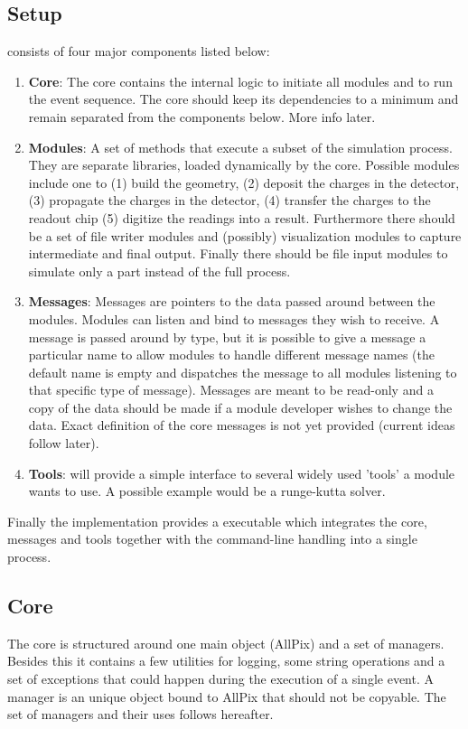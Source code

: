 \subsection{Setup}
\apsq consists of four major components listed below:
\begin{enumerate}
\item \textbf{Core}: The core contains the internal logic to initiate all modules and to run the event sequence. The core should keep its dependencies to a minimum and remain separated from the components below. More info later.
\item \textbf{Modules}: A set of methods that execute a subset of the simulation process. They are separate libraries, loaded dynamically by the core. Possible modules include one to (1) build the geometry, (2) deposit the charges in the detector, (3) propagate the charges in the detector, (4) transfer the charges to the readout chip (5) digitize the readings into a result. Furthermore there should be a set of file writer modules and (possibly) visualization modules to capture intermediate and final output. Finally there should be file input modules to simulate only a part instead of the full process.
\item \textbf{Messages}: Messages are pointers to the data passed around between the modules. Modules can listen and bind to messages they wish to receive. A message is passed around by type, but it is possible to give a message a particular name to allow modules to handle different message names (the default name is empty and dispatches the message to all modules listening to that specific type of message). Messages are meant to be read-only and a copy of the data should be made if a module developer wishes to change the data. Exact definition of the core messages is not yet provided (current ideas follow later).
\item \textbf{Tools}: \apsq will provide a simple interface to several widely used 'tools' a module wants to use. A possible example would be a runge-kutta solver.
\end{enumerate}

Finally the implementation provides a executable which integrates the core, messages and tools together with the command-line handling into a single process.

\subsection{Core}
The core is structured around one main object (AllPix) and a set of managers. Besides this it contains a few utilities for logging, some string operations and a set of exceptions that could happen during the execution of a single event. A manager is an unique object bound to AllPix that should not be copyable. The set of managers and their uses follows hereafter.

